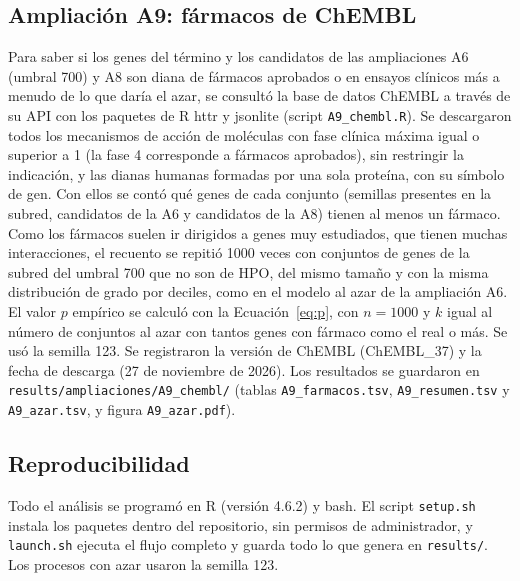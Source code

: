 \subsection{Ampliación A9: fármacos de ChEMBL}

Para saber si los genes del término y los candidatos de las ampliaciones A6 (umbral 700) y A8 son diana de fármacos aprobados o en ensayos clínicos más a menudo de lo que daría el azar, se consultó la base de datos ChEMBL \cite{Zdrazil2024} a través de su API con los paquetes de R httr y jsonlite (script \texttt{A9\_chembl.R}). Se descargaron todos los mecanismos de acción de moléculas con fase clínica máxima igual o superior a 1 (la fase 4 corresponde a fármacos aprobados), sin restringir la indicación, y las dianas humanas formadas por una sola proteína, con su símbolo de gen. Con ellos se contó qué genes de cada conjunto (semillas presentes en la subred, candidatos de la A6 y candidatos de la A8) tienen al menos un fármaco. Como los fármacos suelen ir dirigidos a genes muy estudiados, que tienen muchas interacciones, el recuento se repitió 1000 veces con conjuntos de genes de la subred del umbral 700 que no son de HPO, del mismo tamaño y con la misma distribución de grado por deciles, como en el modelo al azar de la ampliación A6. El valor $p$ empírico se calculó con la Ecuación~\ref{eq:p}, con $n = 1000$ y $k$ igual al número de conjuntos al azar con tantos genes con fármaco como el real o más. Se usó la semilla 123. Se registraron la versión de ChEMBL (ChEMBL\_37) y la fecha de descarga (27 de noviembre de 2026). Los resultados se guardaron en \texttt{results/ampliaciones/A9\_chembl/} (tablas \texttt{A9\_farmacos.tsv}, \texttt{A9\_resumen.tsv} y \texttt{A9\_azar.tsv}, y figura \texttt{A9\_azar.pdf}).

\subsection{Reproducibilidad}

Todo el análisis se programó en R (versión 4.6.2) y bash. El script \texttt{setup.sh} instala los paquetes dentro del repositorio, sin permisos de administrador, y \texttt{launch.sh} ejecuta el flujo completo y guarda todo lo que genera en \texttt{results/}. Los procesos con azar usaron la semilla 123.
